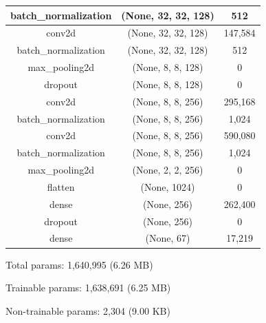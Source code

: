 \documentclass{article}
\begin{document}
\begin{enumerate}
\begin{table}[h!]
\begin{tabular}{|c|c|c|}
                        \hline
                        batch\_normalization & (None, 32, 32, 128) & 512 \\
                        \hline
                        conv2d & (None, 32, 32, 128) & 147,584 \\
                        \hline
                        batch\_normalization & (None, 32, 32, 128) & 512 \\
                        \hline
                        max\_pooling2d & (None, 8, 8, 128) & 0 \\
                        \hline
                        dropout & (None, 8, 8, 128) & 0 \\
                        \hline
                        conv2d & (None, 8, 8, 256) & 295,168 \\
                        \hline
                        batch\_normalization & (None, 8, 8, 256) & 1,024 \\
                        \hline
                        conv2d & (None, 8, 8, 256) & 590,080 \\
                        \hline
                        batch\_normalization & (None, 8, 8, 256) & 1,024 \\
                        \hline
                        max\_pooling2d & (None, 2, 2, 256) & 0 \\
                        \hline
                        flatten & (None, 1024) & 0 \\
                        \hline
                        dense & (None, 256) & 262,400 \\
                        \hline
                        dropout & (None, 256) & 0 \\
                        \hline
                        dense & (None, 67) & 17,219 \\
                        \hline
                    \end{tabular}
                \end{table}

                Total params: 1,640,995 (6.26 MB)

                Trainable params: 1,638,691 (6.25 MB)

                Non-trainable params: 2,304 (9.00 KB)


        
        \newpage


\end{enumerate}
\end{document}
